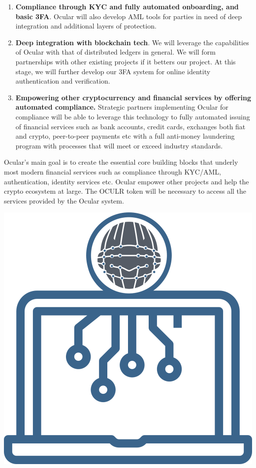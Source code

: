 \documentclass[a4paper]{article}
\begin{document}
\begin{enumerate}
\item \textbf{Compliance through KYC and fully automated onboarding, and basic 3FA}. Ocular will also develop AML tools for parties in need of deep integration and additional layers of protection. 

\item \textbf{Deep integration with blockchain tech}. We will leverage the capabilities of Ocular with that of distributed ledgers in general. We will form partnerships with other existing projects if it betters our project. At this stage, we will further develop our 3FA system for online identity authentication and verification. 

\item \textbf{Empowering other cryptocurrency and financial services by offering automated compliance.} Strategic partners implementing Ocular for compliance will be able to leverage this technology to fully automated issuing of financial services such as bank accounts, credit cards, exchanges both fiat and crypto, peer-to-peer payments etc with a full anti-money laundering program with processes that will meet or exceed industry standards. 


\end{enumerate}

Ocular's main goal is to create the essential core building blocks that underly most modern financial services such as compliance through KYC/AML, authentication, identity services etc. Ocular empower other projects and help the crypto ecosystem at large. The OCULR token will be necessary to access all the services provided by the Ocular system.

\clearpage

\centerline{\includegraphics[width=1.0\textwidth]{ocular-crypto}}
\end{document}
